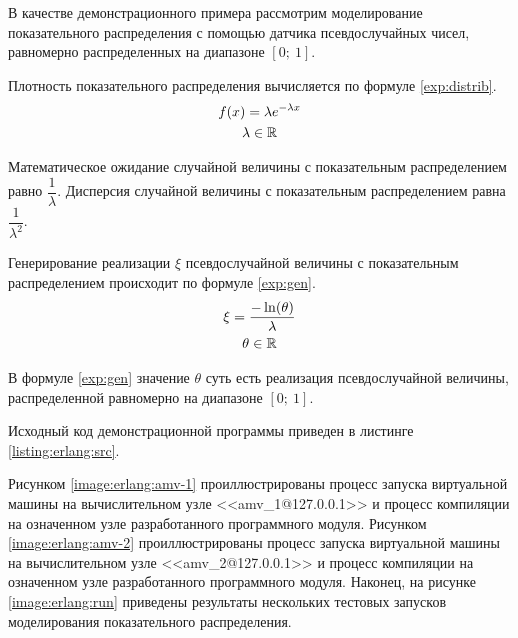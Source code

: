 
В качестве демонстрационного примера рассмотрим моделирование показательного распределения с помощью датчика псевдослучайных чисел, равномерно распределенных на диапазоне $[0 ;~ 1]$.

Плотность показательного распределения вычисляется по формуле \eqref{exp:distrib}.
\begin{gather}
	f(x) = \lambda e^{- \lambda x} \label{exp:distrib} \\
	\lambda \in \mathbb{R} \notag
\end{gather}

Математическое ожидание случайной величины с показательным распределением равно $\dfrac{1}{\lambda}$. Дисперсия случайной величины с показательным распределением равна $\dfrac{1}{\lambda ^ 2}$.

Генерирование реализации $\xi$ псевдослучайной величины с показательным распределением происходит по формуле \eqref{exp:gen}.
\begin{gather}
	\xi = \frac{- \ln(\theta)}{\lambda} \label{exp:gen} \\
	\theta \in \mathbb{R} \notag
\end{gather}

В формуле \eqref{exp:gen} значение $\theta$ суть есть реализация псевдослучайной величины, распределенной равномерно на диапазоне $[0 ;~ 1]$.

Исходный код демонстрационной программы приведен в листинге \ref{listing:erlang:src}.

Рисунком \ref{image:erlang:amv-1} проиллюстрированы процесс запуска виртуальной машины на вычислительном узле <<amv\_1@127.0.0.1>> и процесс компиляции на означенном узле разработанного программного модуля. Рисунком \ref{image:erlang:amv-2} проиллюстрированы процесс запуска виртуальной машины на вычислительном узле <<amv\_2@127.0.0.1>> и процесс компиляции на означенном узле разработанного программного модуля. Наконец, на рисунке \ref{image:erlang:run} приведены результаты нескольких тестовых запусков моделирования показательного распределения.


